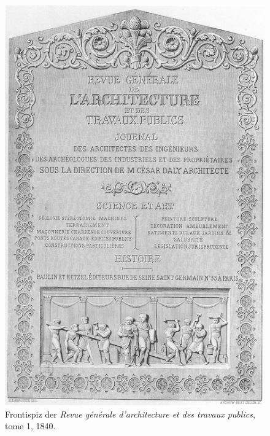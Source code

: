 \begin{figure}[htbp]
\centering
\includegraphics{img/wagner-1.jpg}
\caption{Frontispiz der \emph{Revue générale d'architecture et
des travaux publics}, tome 1, 1840.}
\end{figure}

